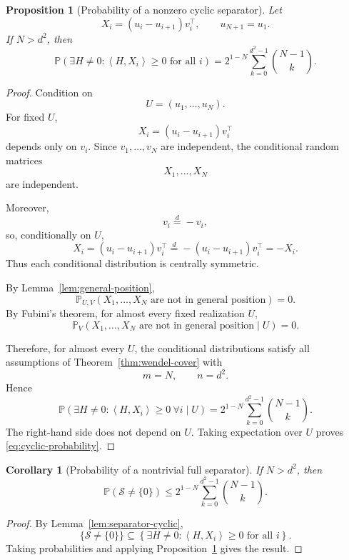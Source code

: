 \documentclass[11pt]{article}
\newtheorem{proposition}[theorem]{Proposition}
\newtheorem{corollary}[theorem]{Corollary}
\newcommand{\ip}[2]{\left\langle #1,#2\right\rangle}
\newcommand{\cS}{\mathcal{S}}
\newcommand{\Pp}{\mathbb{P}}
\newcommand{\1}{\mathbf{1}}
\begin{document}
\begin{proposition}[Probability of a nonzero cyclic separator]
\label{prop:cyclic-probability}
Let
\[
X_i=(u_i-u_{i+1})v_i^\top,
\qquad
u_{N+1}=u_1.
\]
If \(N>d^2\), then
\begin{equation}
\Pp\left(
\exists H\neq 0:
\ip{H}{X_i}\ge 0
\text{ for all }i
\right)
=
2^{1-N}
\sum_{k=0}^{d^2-1}\binom{N-1}{k}.
\label{eq:cyclic-probability}
\end{equation}
\end{proposition}

\begin{proof}
Condition on
\[
U=(u_1,\dots,u_N).
\]
For fixed \(U\),
\[
X_i=(u_i-u_{i+1})v_i^\top
\]
depends only on \(v_i\). Since \(v_1,\dots,v_N\) are independent, the
conditional random matrices
\[
X_1,\dots,X_N
\]
are independent.

Moreover,
\[
v_i\overset{d}{=}-v_i,
\]
so, conditionally on \(U\),
\[
X_i
=
(u_i-u_{i+1})v_i^\top
\overset{d}{=}
-(u_i-u_{i+1})v_i^\top
=
-X_i.
\]
Thus each conditional distribution is centrally symmetric.

By Lemma~\ref{lem:general-position},
\[
\Pp_{U,V}
\left(
X_1,\dots,X_N
\text{ are not in general position}
\right)
=0.
\]
By Fubini's theorem, for almost every fixed realization \(U\),
\[
\Pp_V
\left(
X_1,\dots,X_N
\text{ are not in general position}
\mid U
\right)
=0.
\]

Therefore, for almost every \(U\), the conditional distributions satisfy
all assumptions of Theorem~\ref{thm:wendel-cover} with
\[
m=N,
\qquad
n=d^2.
\]
Hence
\[
\Pp\left(
\exists H\neq 0:
\ip{H}{X_i}\ge 0\ \forall i
\mid U
\right)
=
2^{1-N}
\sum_{k=0}^{d^2-1}\binom{N-1}{k}.
\]
The right-hand side does not depend on \(U\). Taking expectation over
\(U\) proves \eqref{eq:cyclic-probability}.
\end{proof}

\begin{corollary}[Probability of a nontrivial full separator]
\label{cor:full-separator}
If \(N>d^2\), then
\begin{equation}
\Pp(\cS\neq\{0\})
\le
2^{1-N}
\sum_{k=0}^{d^2-1}\binom{N-1}{k}.
\label{eq:full-separator-probability}
\end{equation}
\end{corollary}

\begin{proof}
By Lemma~\ref{lem:separator-cyclic},
\[
\{\cS\neq\{0\}\}
\subseteq
\left\{
\exists H\neq 0:
\ip{H}{X_i}\ge 0
\text{ for all }i
\right\}.
\]
Taking probabilities and applying
Proposition~\ref{prop:cyclic-probability} gives the result.
\end{proof}
\end{document}
